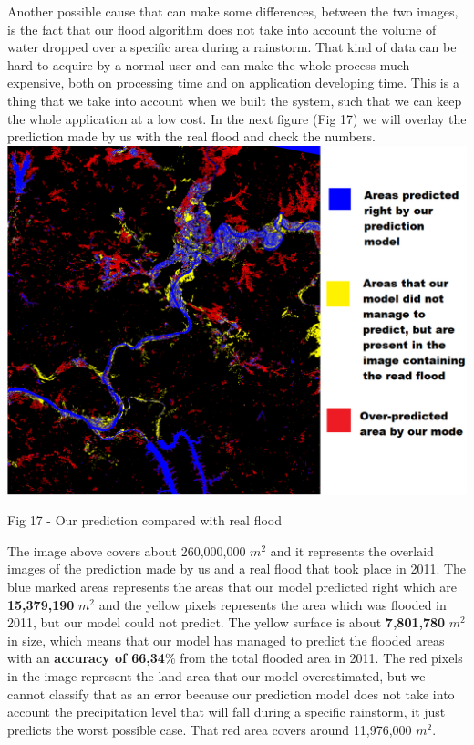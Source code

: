 \documentclass[12pt, a4paper]{report}
\begin{document}
Another possible cause that can make some differences, between the two images, is the fact that our flood algorithm does not take into account the volume of water dropped over a specific area during a rainstorm. That kind of data can be hard to acquire by a normal user and can make the whole process much expensive, both on processing time and on application developing time. This is a thing that we take into account when we built the system, such that we can keep the whole application at a low cost. In the next figure (Fig 17) we will overlay the prediction made by us with the real flood and check the numbers.
\medskip
\includegraphics[scale=0.6, center]{processed_flood_combined.png}
\begin{center}
Fig 17 - Our prediction compared with real flood 
\end{center}
\par 

The image above covers about 260,000,000 $m^2$ and it represents the overlaid images of the prediction made by us and a real flood that took place in 2011. The blue marked areas  represents the areas that our model predicted right which are \textbf{15,379,190} $m^2$ and the yellow pixels represents the area which was flooded in 2011, but our model could not predict. The yellow surface is about \textbf{7,801,780} $m^2$ in size, which means that our model has managed to predict the flooded areas with an \textbf{accuracy of 66,34}\% from the total flooded area in 2011. The red pixels in the image represent the land area that our model overestimated, but we cannot classify that as an error because our prediction model does not take into account the precipitation level that will fall during a specific rainstorm, it just predicts the worst possible case. That red area covers around 11,976,000 $m^2$.
\end{document}
